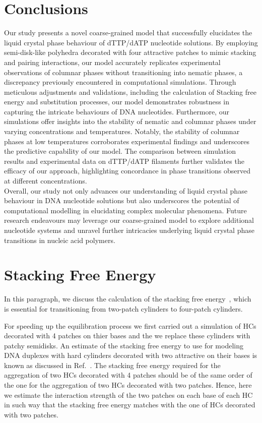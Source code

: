 \documentclass[aip,jcp, amsmath, amssymb, reprint]{revtex4-1}
\begin{document}
\section{\label{Dis}Conclusions}
Our study presents a novel coarse-grained model that successfully elucidates the liquid crystal phase behaviour of dTTP/dATP nucleotide solutions. By employing semi-disk-like polyhedra decorated with four attractive patches to mimic stacking and pairing interactions, our model accurately replicates experimental observations of columnar phases without transitioning into nematic phases, a discrepancy previously encountered in computational simulations. Through meticulous adjustments and validations, including the calculation of Stacking free energy and substitution processes, our model demonstrates robustness in capturing the intricate behaviours of DNA nucleotides. Furthermore, our simulations offer insights into the stability of nematic and columnar phases under varying concentrations and temperatures. Notably, the stability of columnar phases at low temperatures corroborates experimental findings and underscores the predictive capability of our model. The comparison between simulation results and experimental data on dTTP/dATP filaments further validates the efficacy of our approach, highlighting concordance in phase transitions observed at different concentrations. \\

Overall, our study not only advances our understanding of liquid crystal phase behaviour in DNA nucleotide solutions but also underscores the potential of computational modelling in elucidating complex molecular phenomena. Future research endeavours may leverage our coarse-grained model to explore additional nucleotide systems and unravel further intricacies underlying liquid crystal phase transitions in nucleic acid polymers.
\appendix

\section{Stacking Free Energy}\label{app:freeenergy}

In this paragraph, we discuss the calculation of the stacking free energy~\cite{DeMichele12}, which is essential for
transitioning from two-patch cylinders to four-patch cylinders. 

For speeding up the equilibration process we first carried out a simulation of HCs decorated with 4 patches on thier bases and the we replace
these cylinders with patchy semidisks. An estimate of the stacking free energy to use for modeling DNA duplexes with hard cylinders 
decorated with two attractive on their bases is known as discussed in Ref.~\cite{DeMichele12}. The stacking free energy required for the
aggregation of two HCs decorated with 4 patches should be of the same order of the one for the aggregation of two HCs decorated with two patches.
Hence, here we estimate the interaction strength of the two patches on each base of each HC in such way that the stacking free energy matches with
the one of HCs decorated with two patches.
\end{document}
